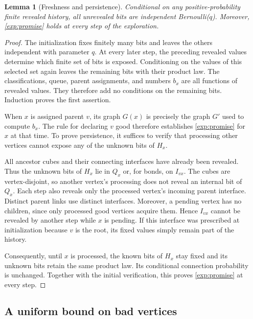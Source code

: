 \documentclass[11pt]{article}
\newtheorem{lemma}[theorem]{Lemma}
\theoremstyle{definition}
\theoremstyle{remark}
\numberwithin{equation}{section}
\begin{document}
\begin{lemma}[Freshness and persistence]
\label{exp:freshness}
Conditional on any positive-probability finite revealed history, all
unrevealed bits are independent Bernoulli($q$). Moreover,
\eqref{exp:promise} holds at every step of the exploration.
\end{lemma}

\begin{proof}
The initialization fixes finitely many bits and leaves the others
independent with parameter $q$. At every later step, the preceding
revealed values determine which finite set of bits is exposed.
Conditioning on the values of this selected set again leaves the
remaining bits with their product law. The classifications, queue,
parent assignments, and numbers $b_x$ are all functions of revealed
values. They therefore add no conditions on the remaining bits.
Induction proves the first assertion.

When $x$ is assigned parent $v$, its graph $G(x)$ is precisely the
graph $G'$ used to compute $b_x$. The rule for declaring $v$ good
therefore establishes \eqref{exp:promise} for $x$ at that time.
To prove persistence, it suffices to verify that processing other
vertices cannot expose any of the unknown bits of $H_x$.

All ancestor cubes and their connecting interfaces have already
been revealed. Thus the unknown bits of $H_x$ lie in $Q_x$ or,
for bonds, on $I_{vx}$. The cubes are vertex-disjoint, so another
vertex's processing does not reveal an internal bit of $Q_x$.
Each step also reveals only the processed vertex's incoming parent
interface. Distinct parent links use distinct interfaces. Moreover, a pending
vertex has no children, since only processed good vertices acquire them.
Hence $I_{vx}$ cannot be revealed by another step while $x$ is
pending. If this interface was prescribed at initialization because
$v$ is the root, its fixed values simply remain part of the history.

Consequently, until $x$ is processed, the known bits of $H_x$ stay
fixed and its unknown bits retain the same product law. Its
conditional connection probability is unchanged. Together with the
initial verification, this proves \eqref{exp:promise} at every step.
\end{proof}

\subsection{A uniform bound on bad vertices}
\end{document}

